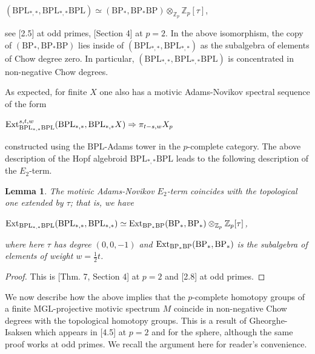 \documentclass[oneside,a4paper]{amsart}
\newcommand{\Ext}{\textnormal{Ext}} %
\newcommand{\MGL}{\mathrm{MGL}} %
\newcommand{\BPL}{\mathrm{BPL}} %
\newcommand{\BP}{\mathrm{BP}} %
\theoremstyle{plain}
\newtheorem{lemma}[thm]{Lemma}
\theoremstyle{definition}
\theoremstyle{remark}
\begin{document}
\begin{center}
$(\BPL_{*, *}, \BPL _{*, *} \BPL) \simeq (\BP_{*}, \BP_{*} \BP) \otimes _{\mathbb{Z}_{p}} \mathbb{Z}_{p}[\tau]$,
\end{center}
see \cite{stahn2016motivic}[2.5] at odd primes, \cite{hu2011remarks}[Section 4] at $p = 2$. In the above isomorphism, the copy of $(\BP_{*}, \BP_{*}\BP)$ lies inside of $(\BPL_{*, *}, \BPL_{*, *})$ as the subalgebra of elements of Chow degree zero. In particular, $(\BPL_{*, *}, \BPL_{*, *} \BPL)$ is concentrated in non-negative Chow degrees.

As expected, for finite $X$ one also has a motivic Adams-Novikov spectral sequence of the form 

\begin{center}
$\Ext^{s, t, w} _{\BPL_{*, *} \BPL} (\BPL_{*, *}, \BPL_{*, *} X) \Rightarrow \pi_{t-s, w} X_{p}$
\end{center}
constructed using the $\BPL$-Adams tower in the $p$-complete category. The above description of the Hopf algebroid $\BPL_{*, *} \BPL$ leads to the following description of the $E_{2}$-term. 

\begin{lemma}
\label{lemma:motivic_adams_novikov_as_topological_extended_by_tau}
The motivic Adams-Novikov $E_{2}$-term coincides with the topological one extended by $\tau$; that is, we have 

\begin{center}
$\Ext _{\BPL_{*, *} \BPL} (\BPL_{*, *}, \BPL_{*, *}) \simeq \Ext_{\BP_{*}\BP}(\BP_{*}, \BP_{*}) \otimes _{\mathbb{Z}_{p}} \mathbb{Z}_{p}[\tau]$,
\end{center}
where here $\tau$ has degree $(0, 0, -1)$ and $\Ext_{\BP_{*}\BP}(\BP_{*}, \BP_{*})$ is the subalgebra of elements of weight $w = \frac{1}{2} t$. 
\end{lemma}

\begin{proof}
This is \cite{hu2011remarks}[Thm. 7, Section 4] at $p = 2$ and \cite{stahn2016motivic}[2.8] at odd primes.
\end{proof}

We now describe how the above implies that the $p$-complete homotopy groups of a finite $\MGL$-projective motivic spectrum $M$ coincide in non-negative Chow degrees with the topological homotopy groups. This is a result of Gheorghe-Isaksen which appears in \cite{gheorghe2017structure}[4.5] at $p = 2$ and for the sphere, although the same proof works at odd primes. We recall the argument here for reader's convenience. 
\end{document}
